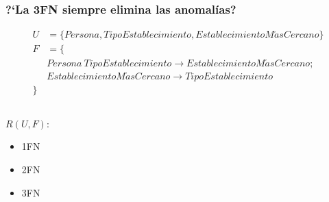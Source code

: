 \begin{frame}
    \frametitle{?`La 3FN siempre elimina las anomal\'ias?}

    \pause

    \begin{align*}
        U &= \{Persona, TipoEstablecimiento, EstablecimientoM\acute{a}sCercano\}  \\
        F &= \{ \\
          & Persona \ TipoEstablecimiento \rightarrow  EstablecimientoM\acute{a}sCercano;\\
          & EstablecimientoM\acute{a}sCercano \rightarrow TipoEstablecimiento \\
          \} &
    \end{align*}

    \pause

    \begin{columns}[c]
        \begin{column}{0.5\textwidth}
    {\Large 
    $R(U, F)$:
    \begin{itemize}[<+->]
        \item[\checkmark] 1FN
        \item[\checkmark] 2FN
        \item[\checkmark] 3FN
    \end{itemize}
    }
        \end{column}
        \begin{column}{0.5\textwidth}
            \centering
        \end{column}
    \end{columns}
\end{frame}

